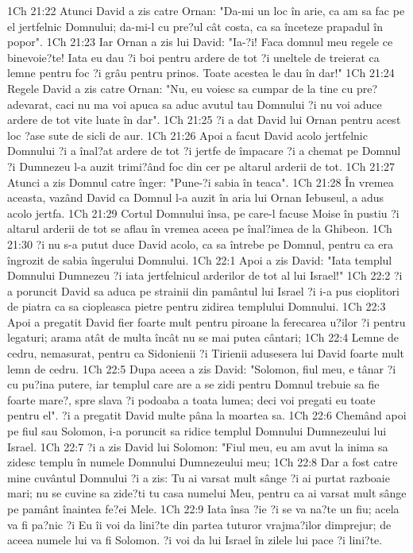 1Ch 21:22  Atunci David a zis catre Ornan: "Da-mi un loc în arie, ca am sa fac pe el jertfelnic Domnului; da-mi-l cu pre?ul cât costa, ca sa înceteze prapadul în popor".
1Ch 21:23  Iar Ornan a zis lui David: "Ia-?i! Faca domnul meu regele ce binevoie?te! Iata eu dau ?i boi pentru ardere de tot ?i uneltele de treierat ca lemne pentru foc ?i grâu pentru prinos. Toate acestea le dau în dar!"
1Ch 21:24  Regele David a zis catre Ornan: "Nu, eu voiesc sa cumpar de la tine cu pre? adevarat, caci nu ma voi apuca sa aduc avutul tau Domnului ?i nu voi aduce ardere de tot vite luate în dar".
1Ch 21:25  ?i a dat David lui Ornan pentru acest loc ?ase sute de sicli de aur.
1Ch 21:26  Apoi a facut David acolo jertfelnic Domnului ?i a înal?at ardere de tot ?i jertfe de împacare ?i a chemat pe Domnul ?i Dumnezeu l-a auzit trimi?ând foc din cer pe altarul arderii de tot.
1Ch 21:27  Atunci a zis Domnul catre înger: "Pune-?i sabia în teaca".
1Ch 21:28  În vremea aceasta, vazând David ca Domnul l-a auzit în aria lui Ornan Iebuseul, a adus acolo jertfa.
1Ch 21:29  Cortul Domnului însa, pe care-l facuse Moise în pustiu ?i altarul arderii de tot se aflau în vremea aceea pe înal?imea de la Ghibeon.
1Ch 21:30  ?i nu s-a putut duce David acolo, ca sa întrebe pe Domnul, pentru ca era îngrozit de sabia îngerului Domnului.
1Ch 22:1  Apoi a zis David: "Iata templul Domnului Dumnezeu ?i iata jertfelnicul arderilor de tot al lui Israel!"
1Ch 22:2  ?i a poruncit David sa aduca pe strainii din pamântul lui Israel ?i i-a pus cioplitori de piatra ca sa ciopleasca pietre pentru zidirea templului Domnului.
1Ch 22:3  Apoi a pregatit David fier foarte mult pentru piroane la ferecarea u?ilor ?i pentru legaturi; arama atât de multa încât nu se mai putea cântari;
1Ch 22:4  Lemne de cedru, nemasurat, pentru ca Sidonienii ?i Tirienii adusesera lui David foarte mult lemn de cedru.
1Ch 22:5  Dupa aceea a zis David: "Solomon, fiul meu, e tânar ?i cu pu?ina putere, iar templul care are a se zidi pentru Domnul trebuie sa fie foarte mare?, spre slava ?i podoaba a toata lumea; deci voi pregati eu toate pentru el". ?i a pregatit David multe pâna la moartea sa.
1Ch 22:6  Chemând apoi pe fiul sau Solomon, i-a poruncit sa ridice templul Domnului Dumnezeului lui Israel.
1Ch 22:7  ?i a zis David lui Solomon: "Fiul meu, eu am avut la inima sa zidesc templu în numele Domnului Dumnezeului meu;
1Ch 22:8  Dar a fost catre mine cuvântul Domnului ?i a zis: Tu ai varsat mult sânge ?i ai purtat razboaie mari; nu se cuvine sa zide?ti tu casa numelui Meu, pentru ca ai varsat mult sânge pe pamânt înaintea fe?ei Mele.
1Ch 22:9  Iata însa ?ie ?i se va na?te un fiu; acela va fi pa?nic ?i Eu îi voi da lini?te din partea tuturor vrajma?ilor dimprejur; de aceea numele lui va fi Solomon. ?i voi da lui Israel în zilele lui pace ?i lini?te.
